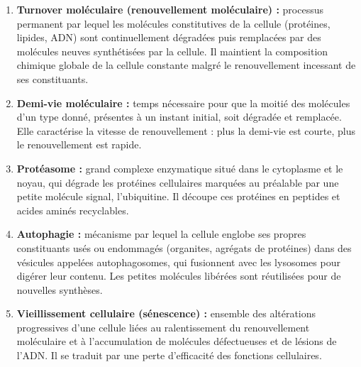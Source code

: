 \documentclass[11pt]{article}
\begin{document}
\begin{corrige}
\begin{enumerate}
\item \textbf{Turnover moléculaire (renouvellement moléculaire) :} processus permanent par lequel les molécules constitutives de la cellule (protéines, lipides, ADN) sont continuellement dégradées puis remplacées par des molécules neuves synthétisées par la cellule. Il maintient la composition chimique globale de la cellule constante malgré le renouvellement incessant de ses constituants.
\item \textbf{Demi-vie moléculaire :} temps nécessaire pour que la moitié des molécules d'un type donné, présentes à un instant initial, soit dégradée et remplacée. Elle caractérise la vitesse de renouvellement : plus la demi-vie est courte, plus le renouvellement est rapide.
\item \textbf{Protéasome :} grand complexe enzymatique situé dans le cytoplasme et le noyau, qui dégrade les protéines cellulaires marquées au préalable par une petite molécule signal, l'ubiquitine. Il découpe ces protéines en peptides et acides aminés recyclables.
\item \textbf{Autophagie :} mécanisme par lequel la cellule englobe ses propres constituants usés ou endommagés (organites, agrégats de protéines) dans des vésicules appelées autophagosomes, qui fusionnent avec les lysosomes pour digérer leur contenu. Les petites molécules libérées sont réutilisées pour de nouvelles synthèses.
\item \textbf{Vieillissement cellulaire (sénescence) :} ensemble des altérations progressives d'une cellule liées au ralentissement du renouvellement moléculaire et à l'accumulation de molécules défectueuses et de lésions de l'ADN. Il se traduit par une perte d'efficacité des fonctions cellulaires.
\end{enumerate}
\end{corrige}
\end{document}
